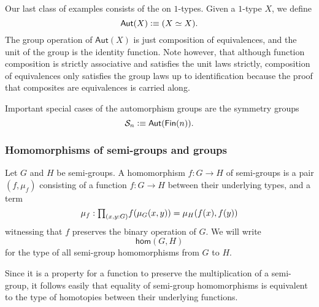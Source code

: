 \begin{eg}
  Our last class of examples consists of the  on $1$-types. Given a $1$-type $X$, we define
  \begin{equation*}
    \mathsf{Aut}(X)\vcentcolon\equiv (X\simeq X).
  \end{equation*}
  The group operation of $\mathsf{Aut}(X)$ is just composition of equivalences, and the unit of the group is the identity function. Note however, that although function composition is strictly associative and satisfies the unit laws strictly, composition of equivalences only satisfies the group laws up to identification because the proof that composites are equivalences is carried along.

  Important special cases of the automorphism groups are the symmetry groups
  \begin{equation*}
    \mathcal{S}_n\vcentcolon\equiv \mathsf{Aut}(\mathsf{Fin}(n)).
  \end{equation*}
\end{eg}

\subsubsection{Homomorphisms of semi-groups and groups}

\begin{defn}
  Let $G$ and $H$ be semi-groups. A homomorphism $f:G\to H$ of semi-groups is a pair $(f,\mu_f)$ consisting of a function $f:G\to H$ between their underlying types, and a term
  \begin{equation*}
    \mu_f:\prd{x,y:G} f(\mu_G(x,y))=\mu_H(f(x),f(y))
  \end{equation*}
  witnessing that $f$ preserves the binary operation of $G$. We will write
  \begin{equation*}
    \mathsf{hom}(G,H)
  \end{equation*}
  for the type of all semi-group homomorphisms from $G$ to $H$.
\end{defn}

\begin{rmk}
  Since it is a property for a function to preserve the multiplication of a semi-group, it follows easily that equality of semi-group homomorphisms is equivalent to the type of homotopies between their underlying functions.
\end{rmk}

